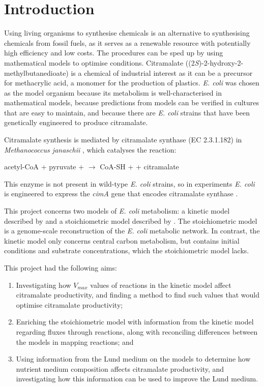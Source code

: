 \documentclass[parskip=full, numbers=noenddot]{scrreprt}
\begin{document}
\chapter*{Introduction}
\label{ch:intro}

Using living organisms to synthesise chemicals is an alternative to synthesising chemicals from fossil fuels, as it serves as a renewable resource with potentially high efficiency and low costs. The procedures can be sped up by using mathematical models to optimise conditions. Citramalate ((2\emph{S})-2-hydroxy-2-methylbutanedioate) is a chemical of industrial interest as it can be a precursor for methacrylic acid, a monomer for the production of plastics. \emph{E. coli} was chosen as the model organism because its metabolism is well-characterised in mathematical models, because predictions from models can be verified in cultures that are easy to maintain, and because there are \emph{E. coli} strains that have been genetically engineered to produce citramalate.

Citramalate synthesis is mediated by citramalate synthase (EC 2.3.1.182) in \emph{Methanococcus janaschii} \citep{wu_production_2016}, which catalyses the reaction:

\begin{center}
  acetyl-CoA + pyruvate +  $\rightarrow$ CoA-SH +  + citramalate
\end{center}

This enzyme is not present in wild-type \emph{E. coli} strains, so in experiments \emph{E. coli} is engineered to express the \emph{cimA} gene that encodes citramalate synthase \citep{wu_production_2016}.

This project concerns two models of \emph{E. coli} metabolism: a kinetic model described by \citet{millard_metabolic_2017} and a stoichiometric model described by \citet{orth_comprehensive_2011}.
The stoichiometric model is a genome-scale reconstruction of the \emph{E. coli} metabolic network. In contrast, the kinetic model only concerns central carbon metabolism, but contains initial conditions and substrate concentrations, which the stoichiometric model lacks.

This project had the following aims:

\begin{enumerate}
\item Investigating how $V_{max}$ values of reactions in the kinetic model affect citramalate productivity, and finding a method to find such values that would optimise citramalate productivity;
\item Enriching the stoichiometric model with information from the kinetic model regarding fluxes through reactions, along with reconciling differences between the models in mapping reactions; and
  \item Using information from the Lund medium \citep{eastham_process_2015} on the models to determine how nutrient medium composition affects citramalate productivity, and investigating how this information can be used to improve the Lund medium.
\end{enumerate}
\end{document}
